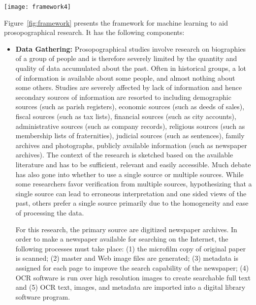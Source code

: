 \begin{figure*}
\centering
\texttt{[image: framework4]}
\caption{Research Framework showing components of proposed solution}
\vspace{-10pt}
\label{fig:framework}

\end{figure*} 

Figure~\ref{fig:framework} presents the framework for machine learning to aid prosopographical research. It has the following components:

\begin{itemize}
\item \textbf{Data Gathering: } Prosopographical studies involve research on biographies of a group of people and is therefore severely limited by the quantity and quality of data accumulated about the past. Often in historical groups, a lot of information is available about some people, and almost nothing about some others. Studies are severely affected by lack of information and hence secondary sources of information are resorted to including demographic sources (such as parish registers), economic sources (such as deeds of sales), fiscal sources (such as tax lists), financial sources (such as city accounts), administrative sources (such as company records), religious sources (such as membership lists of fraternities), judicial sources (such as sentences), family archives and photographs, publicly available information (such as newspaper archives). The context of the research is sketched based on the available literature and has to be sufficient, relevant and easily accessible. Much debate has also gone into whether to use a single source or multiple sources. While some researchers favor verification from multiple sources, hypothesizing that a single source can lead to erroneous interpretation and one sided views of the past, others prefer a single source primarily due to the homogeneity and ease of processing the data. 

For this research, the primary source are digitized newspaper archives. In order to make a newspaper available for searching on the Internet,
the following processes \cite{dutta2011learning} must take place: (1) the microfilm copy of original paper is scanned; (2) master and Web image files are
generated; (3) metadata is assigned for each page to improve the
search capability of the newspaper; (4) OCR software is run over high
resolution images to create searchable full text and (5) OCR text,
images, and metadata are imported into a digital library software
program. 


\end{itemize}
